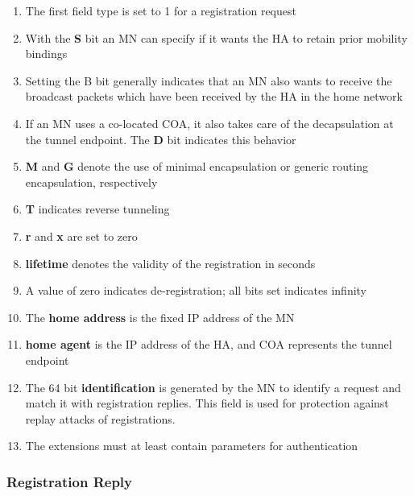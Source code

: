 \begin{multicols}{2}
\begin{enumerate}
	\item The first field type is set to 1 for a registration request
	
	\item With the \textbf{S} bit an MN can specify if it wants the HA to retain prior mobility bindings
	
	\item Setting the B bit generally indicates that an MN also wants to receive the broadcast packets which have been received by the HA in the home
	network
	
	\item If an MN uses a co-located COA, it also takes care of the decapsulation at the tunnel endpoint. The \textbf{D} bit indicates this behavior
	
	\item \textbf{M} and \textbf{G} denote the use of minimal encapsulation or generic routing encapsulation, respectively
	
	\item \textbf{T} indicates reverse tunneling
	
	\item \textbf{r} and \textbf{x} are set to zero
	
	\item \textbf{lifetime} denotes the validity of the registration in seconds
	
	\item A value of zero indicates de-registration; all bits set indicates infinity
	
	\item The \textbf{home address} is the fixed IP address of the MN
	
	\item \textbf{home agent} is the IP address of the HA, and COA represents the tunnel endpoint
	
	\item The 64 bit \textbf{identification} is generated by the MN to identify a request and match it with registration replies. This field is used for protection against replay attacks of registrations.
	
	\item The extensions must at least contain parameters for authentication
\end{enumerate}
\end{multicols}


\subsubsection*{Registration Reply}


